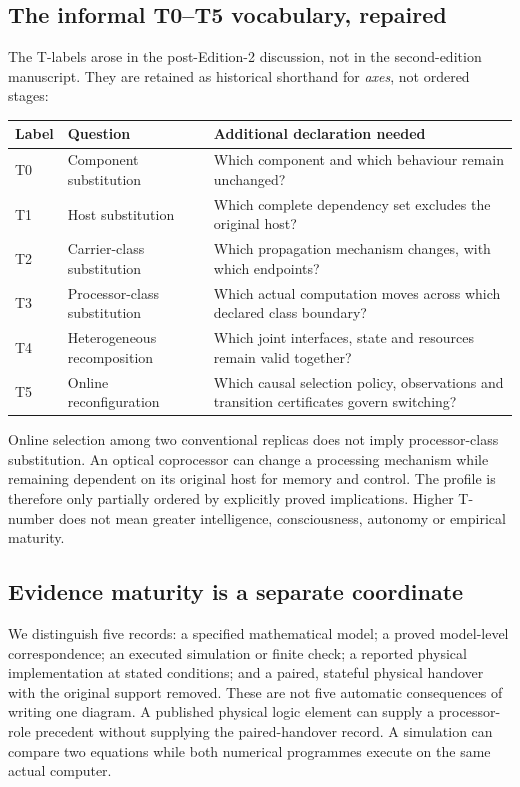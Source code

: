 \subsection{The informal T0--T5 vocabulary, repaired}
The T-labels arose in the post-Edition-2 discussion, not in the second-edition manuscript. They are retained as historical shorthand for \emph{axes}, not ordered stages:
\begin{center}\small
\begin{tabular}{@{}p{}p{}p{}@{}}\toprule
Label & Question & Additional declaration needed \\\midrule
T0 & Component substitution & Which component and which behaviour remain unchanged?\\
T1 & Host substitution & Which complete dependency set excludes the original host?\\
T2 & Carrier-class substitution & Which propagation mechanism changes, with which endpoints?\\
T3 & Processor-class substitution & Which actual computation moves across which declared class boundary?\\
T4 & Heterogeneous recomposition & Which joint interfaces, state and resources remain valid together?\\
T5 & Online reconfiguration & Which causal selection policy, observations and transition certificates govern switching?\\\bottomrule
\end{tabular}
\end{center}
Online selection among two conventional replicas does not imply processor-class substitution. An optical coprocessor can change a processing mechanism while remaining dependent on its original host for memory and control. The profile is therefore only partially ordered by explicitly proved implications. Higher T-number does not mean greater intelligence, consciousness, autonomy or empirical maturity.

\subsection{Evidence maturity is a separate coordinate}
We distinguish five records: a specified mathematical model; a proved model-level correspondence; an executed simulation or finite check; a reported physical implementation at stated conditions; and a paired, stateful physical handover with the original support removed. These are not five automatic consequences of writing one diagram. A published physical logic element can supply a processor-role precedent without supplying the paired-handover record. A simulation can compare two equations while both numerical programmes execute on the same actual computer.

